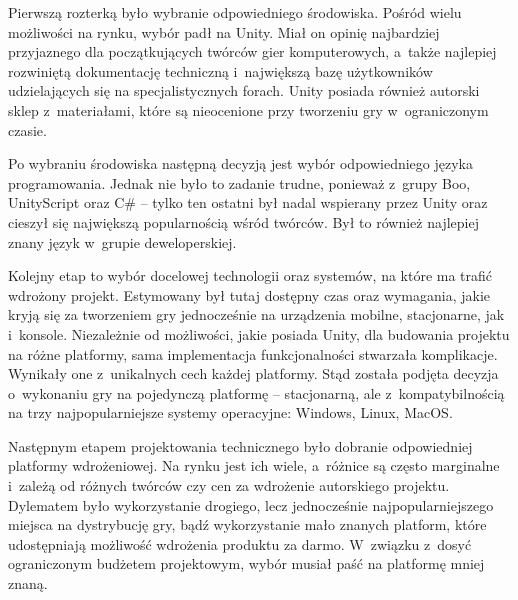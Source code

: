 \documentclass[oneside,polski,logo]{amuthesis}
\begin{document}
Pierwszą rozterką było wybranie odpowiedniego środowiska. Pośród wielu możliwości na rynku, wybór padł na Unity. Miał on opinię najbardziej przyjaznego dla początkujących twórców gier komputerowych, a~także najlepiej rozwiniętą dokumentację techniczną i~największą bazę użytkowników udzielających się na specjalistycznych forach. Unity posiada również autorski sklep z~materiałami, które są nieocenione przy tworzeniu gry w~ograniczonym czasie.

Po wybraniu środowiska następną decyzją jest wybór odpowiedniego języka programowania. Jednak nie było to zadanie trudne, ponieważ z~grupy Boo, UnityScript oraz C\# – tylko ten ostatni był nadal wspierany przez Unity oraz cieszył się największą popularnością wśród twórców. Był to również najlepiej znany język w~grupie deweloperskiej.

Kolejny etap to wybór docelowej technologii oraz systemów, na które ma trafić wdrożony projekt. Estymowany był tutaj dostępny czas oraz wymagania, jakie kryją się za tworzeniem gry jednocześnie na urządzenia mobilne, stacjonarne, jak i~konsole. Niezależnie od możliwości, jakie posiada Unity, dla budowania projektu na różne platformy, sama implementacja funkcjonalności stwarzała komplikacje. Wynikały one z~unikalnych cech każdej platformy. Stąd została podjęta decyzja o~wykonaniu gry na pojedynczą platformę – stacjonarną, ale z~kompatybilnością na trzy najpopularniejsze systemy operacyjne: Windows, Linux, MacOS.

Następnym etapem projektowania technicznego było dobranie odpowiedniej platformy wdrożeniowej. Na rynku jest ich wiele, a~różnice są często marginalne i~zależą od różnych twórców czy cen za wdrożenie autorskiego projektu. Dylematem było wykorzystanie drogiego, lecz jednocześnie najpopularniejszego miejsca na dystrybucję gry, bądź wykorzystanie mało znanych platform, które udostępniają możliwość wdrożenia produktu za darmo. W~związku z~dosyć ograniczonym budżetem projektowym, wybór musiał paść na platformę mniej znaną.
\end{document}
